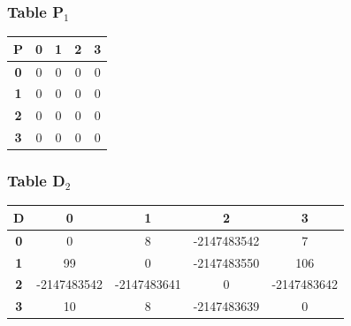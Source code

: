 \documentclass{beamer}
\begin{document}
\begin{frame}
\frametitle{Table P$_{1}$}
\begin{center}
    \begin{tabular}{|c||c|c|c|c|}
        \hline
        \textbf{P} & \textbf{0} & \textbf{1} & \textbf{2} & \textbf{3} \\
        \hline
        \hline
        \textbf{0}& 0 & 0 & 0 & 0 \\
        \hline
        \textbf{1}& 0 & 0 & \cellcolor[HTML]{D74894}0 & \cellcolor[HTML]{D74894}0 \\
        \hline
        \textbf{2}& 0 & \cellcolor[HTML]{D74894}0 & 0 & \cellcolor[HTML]{D74894}0 \\
        \hline
        \textbf{3}& 0 & 0 & \cellcolor[HTML]{D74894}0 & 0 \\
        \hline
    \end{tabular}
\end{center}


\end{frame}





\begin{frame}
\frametitle{Table D$_{2}$}
\begin{center}
    \begin{tabular}{|c||c|c|c|c|}
        \hline
        \textbf{D} & \textbf{0} & \textbf{1} & \textbf{2} & \textbf{3} \\
        \hline
        \hline
        \textbf{0}& 0 & 8 & \cellcolor[HTML]{D74894}-2147483542 & 7 \\
        \hline
        \textbf{1}& 99 & 0 & -2147483550 & 106 \\
        \hline
        \textbf{2}& \cellcolor[HTML]{D74894}-2147483542 & -2147483641 & 0 & -2147483642 \\
        \hline
        \textbf{3}& 10 & 8 & -2147483639 & 0 \\
        \hline
    \end{tabular}
\end{center}


\end{frame}
\end{document}
